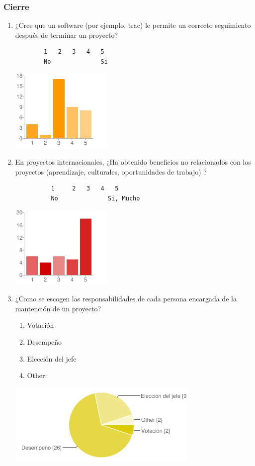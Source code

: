 \subsubsection{Cierre}
\begin{enumerate}
	\item ¿Cree que un software (por ejemplo, trac) le
		permite un correcto seguimiento después de
		terminar un proyecto?
		\begin{verbatim}
        1	2	3	4	5
        No				Si
		\end{verbatim}
        \begin{center}
        \includegraphics[scale=0.7]{images/encuesta2/20}
        \end{center}
	\item En proyectos internacionales, ¿Ha obtenido
		beneficios no relacionados con los proyectos
		(aprendizaje, culturales, oportunidades de
		trabajo) ?
		\begin{verbatim}
          1		2	3	4	5
          No			  Si, Mucho
		\end{verbatim}
        \begin{center}
        \includegraphics[scale=0.7]{images/encuesta2/21}
        \end{center}
	\item ¿Como se escogen las responsabilidades de cada
		persona encargada de la mantención de un proyecto?
		\begin{enumerate}
			\item Votación
			\item Desempeño
			\item Elección del jefe
			\item Other: 
		\end{enumerate}
        \begin{center}
        \includegraphics[scale=0.7]{images/encuesta2/22}
        \end{center}
\end{enumerate}

